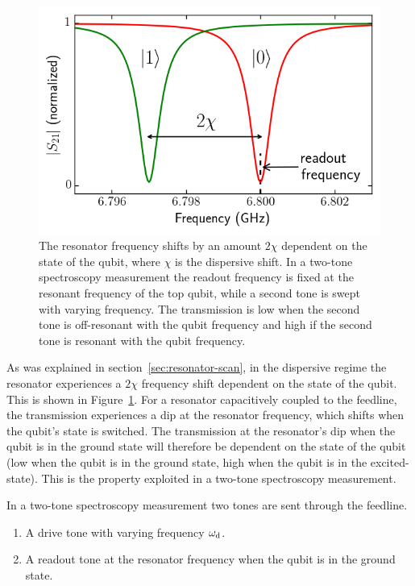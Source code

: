         \begin{figure}[tb]
          \centering
          \includegraphics[width=.5\textwidth]{../Figures/Qubit characterization/dispersive shift.png}
          \caption{The resonator frequency shifts by an amount $2\chi$ dependent on the state of the qubit, where $\chi$ is the dispersive shift. In a two-tone spectroscopy measurement the readout frequency is fixed at the resonant frequency of the top qubit, while a second tone is swept with varying frequency. The transmission is low when the second tone is off-resonant with the qubit frequency and high if the second tone is resonant with the qubit frequency.}
          \label{fig:dispersive shift}
        \end{figure}

        As was explained in section~\ref{sec:resonator-scan}, in the dispersive regime the resonator experiences a $2 \chi$ frequency shift dependent on the state of the qubit. This is shown in Figure~\ref{fig:dispersive shift}. For a resonator capacitively coupled to the feedline, the transmission experiences a dip at the resonator frequency, which shifts when the qubit's state is switched. The transmission at the resonator's dip when the qubit is in the ground state will therefore be dependent on the state of the qubit (low when the qubit is in the ground state, high when the qubit is in the excited-state). This is the property exploited in a two-tone spectroscopy measurement.

        In a two-tone spectroscopy measurement two tones are sent through the feedline.
        \begin{enumerate}
          \item A drive tone with varying frequency $\omega_\text{d}$.
          \item A readout tone at the resonator frequency when the qubit is in the ground state.
        \end{enumerate}

